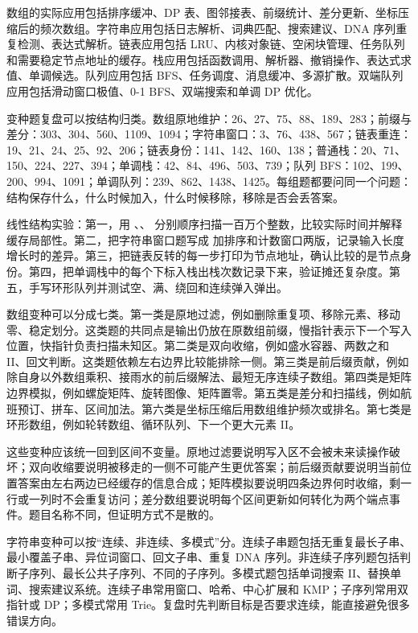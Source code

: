 
数组的实际应用包括排序缓冲、DP 表、图邻接表、前缀统计、差分更新、坐标压缩后的频次数组。字符串应用包括日志解析、词典匹配、搜索建议、DNA 序列重复检测、表达式解析。链表应用包括 LRU、内核对象链、空闲块管理、任务队列和需要稳定节点地址的缓存。栈应用包括函数调用、解析器、撤销操作、表达式求值、单调候选。队列应用包括 BFS、任务调度、消息缓冲、多源扩散。双端队列应用包括滑动窗口极值、0-1 BFS、双端搜索和单调 DP 优化。

变种题复盘可以按结构归类。数组原地维护：26、27、75、88、189、283；前缀与差分：303、304、560、1109、1094；字符串窗口：3、76、438、567；链表重连：19、21、24、25、92、206；链表身份：141、142、160、138；普通栈：20、71、150、224、227、394；单调栈：42、84、496、503、739；队列 BFS：102、199、200、994、1091；单调队列：239、862、1438、1425。每组题都要问同一个问题：结构保存什么，什么时候加入，什么时候移除，移除是否会丢答案。

\begin{labbox}
线性结构实验：第一，用 、、 分别顺序扫描一百万个整数，比较实际时间并解释缓存局部性。第二，把字符串窗口题写成  加排序和计数窗口两版，记录输入长度增长时的差异。第三，把链表反转的每一步打印为节点地址，确认比较的是节点身份。第四，把单调栈中的每个下标入栈出栈次数记录下来，验证摊还复杂度。第五，手写环形队列并测试空、满、绕回和连续弹入弹出。
\end{labbox}


数组变种可以分成七类。第一类是原地过滤，例如删除重复项、移除元素、移动零、稳定划分。这类题的共同点是输出仍放在原数组前缀，慢指针表示下一个写入位置，快指针负责扫描未知区。第二类是双向收缩，例如盛水容器、两数之和 II、回文判断。这类题依赖左右边界比较能排除一侧。第三类是前后缀贡献，例如除自身以外数组乘积、接雨水的前后缀解法、最短无序连续子数组。第四类是矩阵边界模拟，例如螺旋矩阵、旋转图像、矩阵置零。第五类是差分和扫描线，例如航班预订、拼车、区间加法。第六类是坐标压缩后用数组维护频次或排名。第七类是环形数组，例如轮转数组、循环队列、下一个更大元素 II。

这些变种应该统一回到区间不变量。原地过滤要说明写入区不会被未来读操作破坏；双向收缩要说明被移走的一侧不可能产生更优答案；前后缀贡献要说明当前位置答案由左右两边已经缓存的信息合成；矩阵模拟要说明四条边界何时收缩，剩一行或一列时不会重复访问；差分数组要说明每个区间更新如何转化为两个端点事件。题目名称不同，但证明方式不是散的。

字符串变种可以按“连续、非连续、多模式”分。连续子串题包括无重复最长子串、最小覆盖子串、异位词窗口、回文子串、重复 DNA 序列。非连续子序列题包括判断子序列、最长公共子序列、不同的子序列。多模式题包括单词搜索 II、替换单词、搜索建议系统。连续子串常用窗口、哈希、中心扩展和 KMP；子序列常用双指针或 DP；多模式常用 Trie。复盘时先判断目标是否要求连续，能直接避免很多错误方向。

